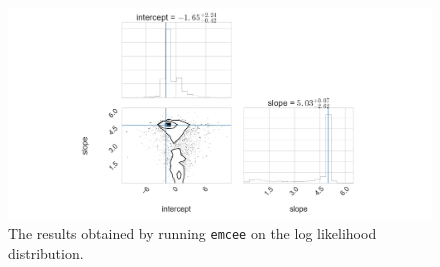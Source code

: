 \documentclass[12pt,usletter,english]{article}
\begin{document}
\begin{figure}[!h]
  \centering \includegraphics[width=13cm]{emcee_fit.png}
  \caption{The results obtained by running \texttt{emcee} on the log
    likelihood distribution.
    \label{fig:emcee_fit}}
\end{figure}
\end{document}

